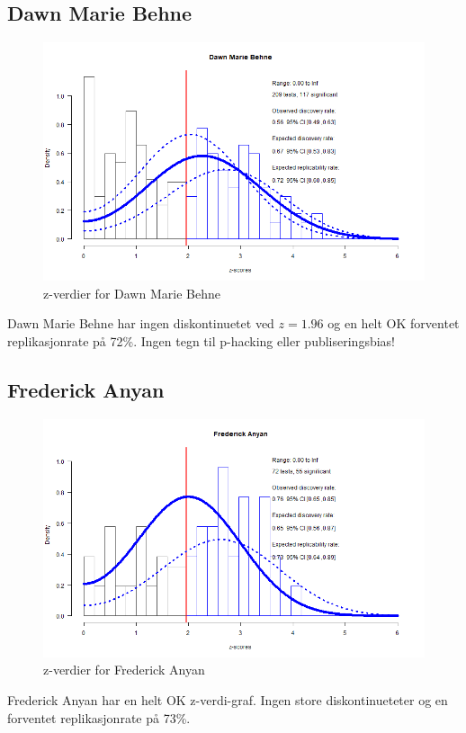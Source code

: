 \documentclass[doc,norsk]{apa7}
\begin{document}
\subsection{Dawn Marie Behne}
\begin{figure}[h!]
    \centering
    \includegraphics[width=\textwidth]{images/Dawn Marie Behne.png}
    \caption{z-verdier for Dawn Marie Behne}
\end{figure}
Dawn Marie Behne har ingen diskontinuetet ved $z=1.96$ og en helt OK forventet replikasjonrate på 72\%. Ingen tegn til p-hacking eller publiseringsbias!

\subsection{Frederick Anyan}
\begin{figure}[h!]
    \centering
    \includegraphics[width=\textwidth]{images/Frederick Anyan.png}
    \caption{z-verdier for Frederick Anyan}
\end{figure}
Frederick Anyan har en helt OK z-verdi-graf. Ingen store diskontinueteter og en forventet replikasjonrate på 73\%.
\end{document}
